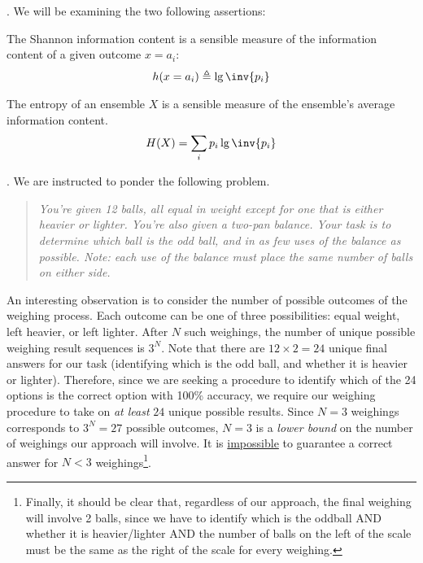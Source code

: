 \documentclass[11pt]{article}
\newcommand\myspace[1][]{\vspace{#1\bigskipamount}}
\newcommand\p{\Needspace{10\baselineskip} \noindent}
\begin{document}

\p {}. We will be examining the two following assertions:
\begin{compactenum}
	\item The Shannon information content is a sensible measure of the information content of a given outcome $x = a_i$:
	\begin{align}
		h(x = a_i) \triangleq \lg\inv{p_i} \label{shannon-info-content}
	\end{align}
	
	\item The entropy of an ensemble $X$ is a sensible measure of the ensemble's average information content. 
	\begin{align}
		H(X) = \sum_i p_i \lg\inv{p_i}
	\end{align}
\end{compactenum}

\myspace
\p {}. We are instructed to ponder the following problem. 
\vspace{-1em}
\begin{quote}
	{\itshape\footnotesize You're given 12 balls, all equal in weight except for one that is either heavier or lighter. You're also given a two-pan balance. Your task is to determine which ball is the odd ball, and in as few uses of the balance as possible. Note: each use of the balance must place the same number of balls on either side.}
\end{quote}
An interesting observation is to consider the number of possible outcomes of the weighing process. Each outcome can be one of three possibilities: equal weight, left heavier, or left lighter. After $N$ such weighings, the number of unique possible weighing result sequences is $3^N$. Note that there are $12 \times 2 = 24$ unique final answers for our task (identifying which is the odd ball, and whether it is heavier or lighter). Therefore, since we are seeking a procedure to identify which of the 24 options is the correct option with 100\% accuracy, we require our weighing procedure to take on \textit{at least} $24$ unique possible results. Since $N=3$ weighings corresponds to $3^N = 27$ possible outcomes, $N=3$ is a \textit{lower bound} on the number of weighings our approach will involve. It is \underline{impossible} to guarantee a correct answer for $N < 3$ weighings\footnote{Finally, it should be clear that, regardless of our approach, the final weighing will involve 2 balls, since we have to identify which is the oddball AND whether it is heavier/lighter AND the number of balls on the left of the scale must be the same as the right of the scale for every weighing.}. \\
\end{document}
